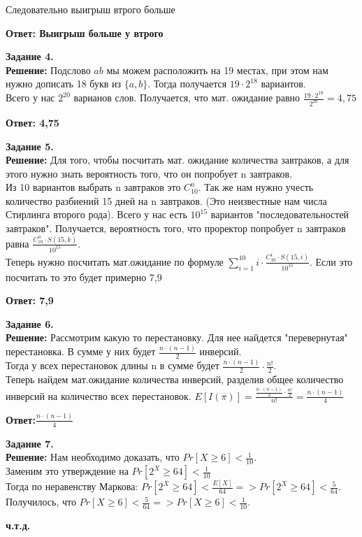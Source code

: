 \documentclass[12pt,a4paper]{scrartcl}
\begin{document}
	Следовательно выигрыш втрого больше
	\begin{flushright}	
		\textbf{Ответ: Выигрыш больше у втрого}
	\end{flushright}
	\newpage
	\noindent
	\textbf{Задание 4.} 
	\\
	\textbf{Решение:} 
		Подслово $ab$ мы можем расположить на 19 местах, при этом нам нужно дописать 18 букв из $\{a, b\}$. Тогда получается $19 \cdot 2^{18}$ вариантов. \\
		Всего у нас $2^{20}$ варианов слов.
		Получается, что мат. ожидание равно $\frac{19 \cdot 2^{18}}{2^{20}} = 4,75$
	\begin{flushright}
		\textbf{Ответ: 4,75}
	\end{flushright}
	\textbf{Задание 5.} 
	\\
	\textbf{Решение:} 
	Для того, чтобы посчитать мат. ожидание количества завтраков, а для этого нужно знать вероятность того, что он попробует n завтраков.\\
	Из 10 вариантов выбрать n завтраков это $C_{10}^{n}$. Так же нам нужно учесть количество разбиений 15 дней на n завтраков. (Это неизвестные нам числа Стирлинга второго рода). Всего у нас есть $10^{15}$ вариантов "последовательностей завтраков". Получается, вероятность того, что проректор попробует n завтраков равна $\frac{C_{10}^{n}\cdot S(15,k)}{10^{15}}$.\\
	Теперь нужно посчитать мат.ожидание по формуле $\sum\limits_{i=1}^{10} i\cdot\frac{C_{10}^{i}\cdot S(15,i)}{10^{15}}$. Если это посчитать то это будет примерно 7,9
	\begin{flushright}
		\textbf{Ответ: 7,9}
	\end{flushright}
	\textbf{Задание 6.} 
	\\
	\textbf{Решение:} 
		Рассмотрим какую то перестановку. Для нее найдется "перевернутая" перестановка. В сумме у них будет $\frac{n\cdot(n - 1)}{2}$ инверсий.\\
		Тогда у всех перестановок длины n в сумме будет $\frac{n\cdot(n - 1)}{2} \cdot \frac{n!}{2}$.\\
		Теперь найдем мат.ожидание количества инверсий, разделив общее количество инверсий на количество всех перестановок. 
		$E[I(\pi)] = \frac{\frac{n\cdot(n - 1)}{2} \cdot \frac{n!}{2}} {n!} = \frac{n \cdot(n - 1)}{4}$
	\begin{flushright}
		\textbf{Ответ:$\frac{n \cdot(n - 1)}{4}$}
	\end{flushright}
	\textbf{Задание 7.} 
	\\
	\textbf{Решение:}
	Нам необходимо доказать, что $Pr[X \geqslant 6] < \frac{1}{10}$. \\
	Заменим это утверждение на $Pr[2^X \geqslant 64] < \frac{1}{10}$\\
	Тогда по неравенству Маркова: $Pr[2^X \geqslant 64] < \frac{E[X]}{64} => Pr[2^X \geqslant 64] < \frac{5}{64}$. \\
	Получилось, что $Pr[X \geqslant 6] < \frac{5}{64} => Pr[X \geqslant 6] < \frac{1}{10}$.
	\begin{flushright}
		\textbf{ч.т.д.}
	\end{flushright}
\end{document}
